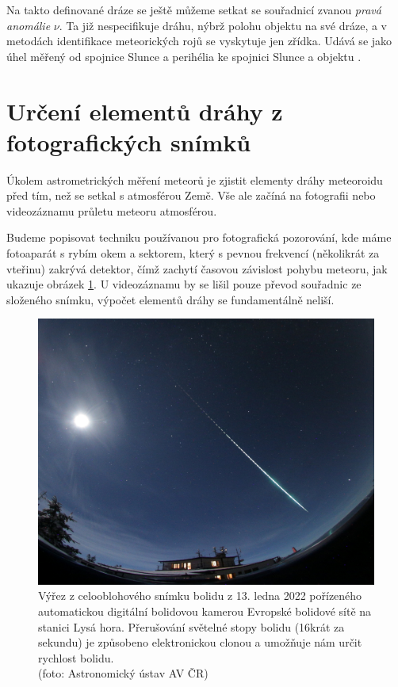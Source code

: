 \medskip

Na takto definované dráze se ještě můžeme setkat se souřadnicí zvanou \textit{pravá anomálie} $\nu$. Ta již nespecifikuje dráhu, nýbrž polohu objektu na své dráze, a v metodách identifikace meteorických rojů se vyskytuje jen zřídka. Udává se jako úhel měřený od spojnice Slunce a perihélia ke spojnici Slunce a objektu \cite{astro}.

\section{Určení elementů dráhy z fotografických snímků}\label{sec:photography}%
Úkolem astrometrických měření meteorů je zjistit elementy dráhy meteoroidu před tím, než se setkal s atmosférou Země. Vše ale začíná na fotografii nebo videozáznamu průletu meteoru atmosférou.

Budeme popisovat techniku používanou pro fotografická pozorování, kde máme fotoaparát s rybím okem a sektorem, který s pevnou frekvencí (několikrát za vteřinu) zakrývá detektor, čímž zachytí časovou závislost pohybu meteoru, jak ukazuje obrázek \ref{img:observation:wholesky}. U videozáznamu by se lišil pouze převod souřadnic ze složeného snímku, výpočet elementů dráhy se fundamentálně neliší.

\begin{figure}[h]
    \centering
    \includegraphics[width=.8\linewidth]{img/meteors/night-whole-sky.jpg}
    \caption[Výřez z celooblohového snímku bolidu]{
        Výřez z celooblohového snímku bolidu z 13. ledna 2022 pořízeného automatickou digitální bolidovou kamerou Evropské bolidové sítě na stanici Lysá hora. Přerušování světelné stopy bolidu (16krát za sekundu) je způsobeno elektronickou clonou a umožňuje nám určit rychlost bolidu.\footnotemark\\
        {\small (foto: Astronomický ústav AV ČR)}
    }
    \label{img:observation:wholesky}
\end{figure}

